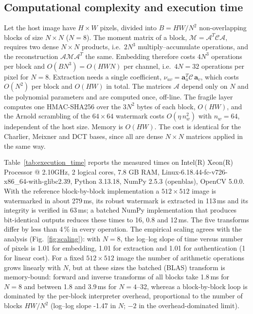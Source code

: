 \subsection{Computational complexity and execution time}\label{sec:complexity}

Let the host image have $H\times W$ pixels, divided into $B=HW/N^2$ non-overlapping blocks of
size $N\times N$ ($N=8$). The moment matrix of a block, $\mathcal{M}=\mathcal{A}^{T}\mathcal{C}\mathcal{A}$,
requires two dense $N\times N$ products, i.e.\ $2N^3$ multiply--accumulate operations, and the
reconstruction $\mathcal{A}\mathcal{M}\mathcal{A}^{T}$ the same. Embedding therefore costs
$4N^3$ operations per block and $O(BN^3)=O(HWN)$ per channel, i.e.\ $4N=32$ operations per pixel for
$N=8$. Extraction needs a single coefficient, $\nu_{uv}=\mathbf a_u^{T}\mathcal{C}\,\mathbf a_v$,
which costs $O(N^2)$ per block and $O(HW)$ in total. The matrices $\mathcal{A}$ depend only on
$N$ and the polynomial parameters and are computed once, off-line. The fragile layer computes one
HMAC-SHA256 over the $3N^2$ bytes of each block, $O(HW)$, and the Arnold scrambling of the
$64\times64$ watermark costs $O(\eta\,n_w^2)$ with $n_w=64$, independent of the host size. Memory
is $O(HW)$. The cost is identical for the Charlier, Meixner and DCT bases, since all are dense
$N\times N$ matrices applied in the same way.

Table~\ref{tab:execution_time} reports the measured times on Intel(R) Xeon(R) Processor @ 2.10GHz, 2 logical cores, 7.8 GB RAM, Linux-6.18.44-fc-v726-x86\_64-with-glibc2.39, Python 3.13.18, NumPy 2.5.3 (openblas), OpenCV 5.0.0. With the reference
block-by-block implementation a $512\times512$ image is watermarked in about
279\,ms, its robust watermark is extracted in 113\,ms
and its integrity is verified in 63\,ms; a batched NumPy implementation
that produces bit-identical outputs reduces these times to 16,
0.8 and 12\,ms. The five transforms differ by
less than 4\,\% in every operation. The empirical scaling agrees with the analysis (Fig.~\ref{fig:scaling}): with $N=8$, the
log--log slope of time versus number of pixels is 1.01 for embedding,
1.01 for extraction and 1.01 for authentication
(1 for linear cost). For a fixed $512\times512$ image the number of arithmetic operations grows
linearly with $N$, but at these sizes the batched (BLAS) transform is memory-bound: forward and
inverse transforms of all blocks take 1.8\,ms for $N=8$ and between 1.8 and
3.9\,ms for $N=4$--32, whereas a block-by-block loop is dominated by the per-block
interpreter overhead, proportional to the number of blocks $HW/N^2$ (log--log slope
-1.47 in $N$; $-2$ in the overhead-dominated limit).
